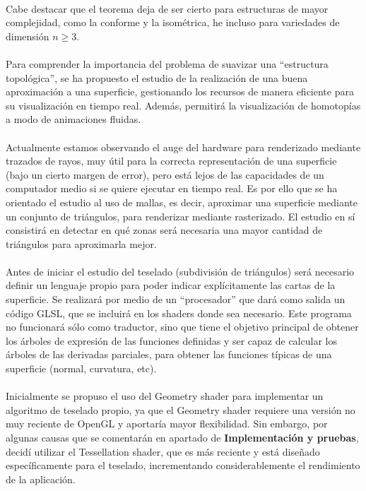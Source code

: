 \\Cabe destacar que el teorema deja de ser cierto para estructuras de mayor complejidad, como la conforme y la isométrica, he incluso para variedades de dimensión $n \geq 3$.\\
\\Para comprender la importancia del problema de suavizar una ``estructura topológica'', se ha propuesto el estudio de la realización de una buena aproximación a una superficie, gestionando los recursos de manera eficiente para su visualización en tiempo real. Además, permitirá la visualización de homotopías a modo de animaciones fluidas.\\
\\Actualmente estamos observando el auge del hardware para renderizado mediante trazados de rayos, muy útil para la correcta representación de una superficie (bajo un cierto margen de error), pero está lejos de las capacidades de un computador medio si se quiere ejecutar en tiempo real. Es por ello que se ha orientado el estudio al uso de mallas, es decir, aproximar una superficie mediante un conjunto de triángulos, para renderizar mediante rasterizado. El estudio en sí consistirá en detectar en qué zonas será necesaria una mayor cantidad de triángulos para aproximarla mejor.\\
\\Antes de iniciar el estudio del teselado (subdivisión de triángulos) será necesario definir un lenguaje propio para poder indicar explícitamente las cartas de la superficie. Se realizará por medio de un ``procesador'' que dará como salida un código GLSL, que se incluirá en los shaders donde sea necesario. Este programa no funcionará sólo como traductor, sino que tiene el objetivo principal de obtener los árboles de expresión de las funciones definidas y ser capaz de calcular los árboles de las derivadas parciales, para obtener las funciones típicas de una superficie (normal, curvatura, etc).\\
\\Inicialmente se propuso el uso del Geometry shader para implementar un algoritmo de teselado propio, ya que el Geometry shader requiere una versión no muy reciente de OpenGL y aportaría mayor flexibilidad. Sin embargo, por algunas causas que se comentarán en apartado de \textbf{Implementación y pruebas}, decidí utilizar el Tessellation shader, que es más reciente y está diseñado específicamente para el teselado, incrementando considerablemente el rendimiento de la aplicación.\\
